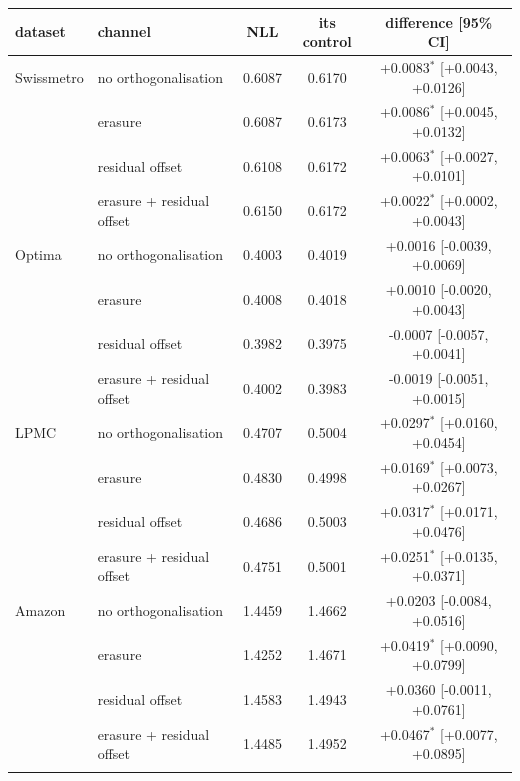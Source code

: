 \begin{tabular}{llccc}
\toprule
dataset & channel & NLL & its control & difference [95\% CI] \\
\midrule
Swissmetro & no orthogonalisation & 0.6087 & 0.6170 & +0.0083$^{*}$ [+0.0043, +0.0126] \\
 & erasure & 0.6087 & 0.6173 & +0.0086$^{*}$ [+0.0045, +0.0132] \\
 & residual offset & 0.6108 & 0.6172 & +0.0063$^{*}$ [+0.0027, +0.0101] \\
 & erasure + residual offset & 0.6150 & 0.6172 & +0.0022$^{*}$ [+0.0002, +0.0043] \\
\addlinespace
Optima & no orthogonalisation & 0.4003 & 0.4019 & +0.0016 [-0.0039, +0.0069] \\
 & erasure & 0.4008 & 0.4018 & +0.0010 [-0.0020, +0.0043] \\
 & residual offset & 0.3982 & 0.3975 & -0.0007 [-0.0057, +0.0041] \\
 & erasure + residual offset & 0.4002 & 0.3983 & -0.0019 [-0.0051, +0.0015] \\
\addlinespace
LPMC & no orthogonalisation & 0.4707 & 0.5004 & +0.0297$^{*}$ [+0.0160, +0.0454] \\
 & erasure & 0.4830 & 0.4998 & +0.0169$^{*}$ [+0.0073, +0.0267] \\
 & residual offset & 0.4686 & 0.5003 & +0.0317$^{*}$ [+0.0171, +0.0476] \\
 & erasure + residual offset & 0.4751 & 0.5001 & +0.0251$^{*}$ [+0.0135, +0.0371] \\
\addlinespace
Amazon & no orthogonalisation & 1.4459 & 1.4662 & +0.0203 [-0.0084, +0.0516] \\
 & erasure & 1.4252 & 1.4671 & +0.0419$^{*}$ [+0.0090, +0.0799] \\
 & residual offset & 1.4583 & 1.4943 & +0.0360 [-0.0011, +0.0761] \\
 & erasure + residual offset & 1.4485 & 1.4952 & +0.0467$^{*}$ [+0.0077, +0.0895] \\
\addlinespace
\bottomrule
\end{tabular}